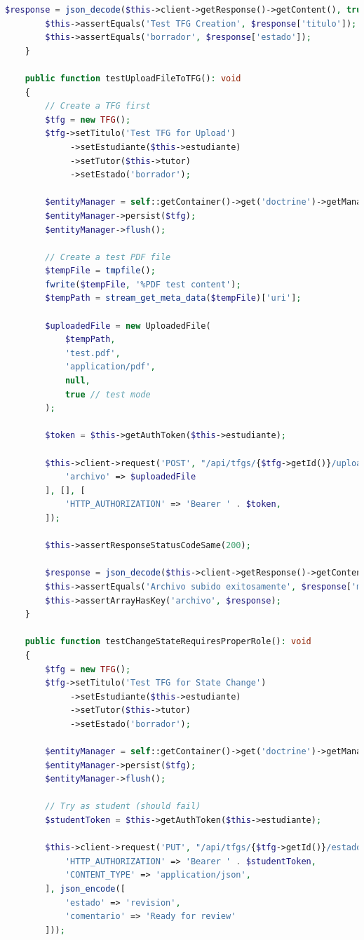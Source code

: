 \documentclass[12pt,a4paper,oneside]{report}
\begin{document}
\begin{lstlisting}[language=PHP]
        $response = json_decode($this->client->getResponse()->getContent(), true);
        $this->assertEquals('Test TFG Creation', $response['titulo']);
        $this->assertEquals('borrador', $response['estado']);
    }

    public function testUploadFileToTFG(): void
    {
        // Create a TFG first
        $tfg = new TFG();
        $tfg->setTitulo('Test TFG for Upload')
             ->setEstudiante($this->estudiante)
             ->setTutor($this->tutor)
             ->setEstado('borrador');

        $entityManager = self::getContainer()->get('doctrine')->getManager();
        $entityManager->persist($tfg);
        $entityManager->flush();

        // Create a test PDF file
        $tempFile = tmpfile();
        fwrite($tempFile, '%PDF test content');
        $tempPath = stream_get_meta_data($tempFile)['uri'];

        $uploadedFile = new UploadedFile(
            $tempPath,
            'test.pdf',
            'application/pdf',
            null,
            true // test mode
        );

        $token = $this->getAuthToken($this->estudiante);

        $this->client->request('POST', "/api/tfgs/{$tfg->getId()}/upload", [
            'archivo' => $uploadedFile
        ], [], [
            'HTTP_AUTHORIZATION' => 'Bearer ' . $token,
        ]);

        $this->assertResponseStatusCodeSame(200);
        
        $response = json_decode($this->client->getResponse()->getContent(), true);
        $this->assertEquals('Archivo subido exitosamente', $response['message']);
        $this->assertArrayHasKey('archivo', $response);
    }

    public function testChangeStateRequiresProperRole(): void
    {
        $tfg = new TFG();
        $tfg->setTitulo('Test TFG for State Change')
             ->setEstudiante($this->estudiante)
             ->setTutor($this->tutor)
             ->setEstado('borrador');

        $entityManager = self::getContainer()->get('doctrine')->getManager();
        $entityManager->persist($tfg);
        $entityManager->flush();

        // Try as student (should fail)
        $studentToken = $this->getAuthToken($this->estudiante);
        
        $this->client->request('PUT', "/api/tfgs/{$tfg->getId()}/estado", [], [], [
            'HTTP_AUTHORIZATION' => 'Bearer ' . $studentToken,
            'CONTENT_TYPE' => 'application/json',
        ], json_encode([
            'estado' => 'revision',
            'comentario' => 'Ready for review'
        ]));


\end{lstlisting}
\end{document}
